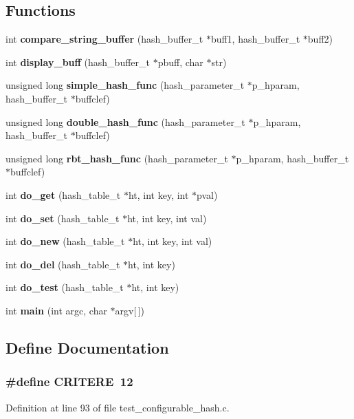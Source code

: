 \subsection*{Functions}
\begin{DoxyCompactItemize}
\item 
int {\bf compare\_\-string\_\-buffer} (hash\_\-buffer\_\-t $\ast$buff1, hash\_\-buffer\_\-t $\ast$buff2)
\item 
int {\bf display\_\-buff} (hash\_\-buffer\_\-t $\ast$pbuff, char $\ast$str)
\item 
unsigned long {\bf simple\_\-hash\_\-func} (hash\_\-parameter\_\-t $\ast$p\_\-hparam, hash\_\-buffer\_\-t $\ast$buffclef)
\item 
unsigned long {\bf double\_\-hash\_\-func} (hash\_\-parameter\_\-t $\ast$p\_\-hparam, hash\_\-buffer\_\-t $\ast$buffclef)
\item 
unsigned long {\bf rbt\_\-hash\_\-func} (hash\_\-parameter\_\-t $\ast$p\_\-hparam, hash\_\-buffer\_\-t $\ast$buffclef)
\item 
int {\bf do\_\-get} (hash\_\-table\_\-t $\ast$ht, int key, int $\ast$pval)
\item 
int {\bf do\_\-set} (hash\_\-table\_\-t $\ast$ht, int key, int val)
\item 
int {\bf do\_\-new} (hash\_\-table\_\-t $\ast$ht, int key, int val)
\item 
int {\bf do\_\-del} (hash\_\-table\_\-t $\ast$ht, int key)
\item 
int {\bf do\_\-test} (hash\_\-table\_\-t $\ast$ht, int key)
\item 
int {\bf main} (int argc, char $\ast$argv[$\,$])
\end{DoxyCompactItemize}


\subsection{Define Documentation}
\subsubsection[{CRITERE}]{\setlength{\rightskip}{0pt plus 5cm}\#define CRITERE~12}\label{test__configurable__hash_8c_ab2da1e226a5beeff3269ec19b1f2b0b9}


Definition at line 93 of file test\_\-configurable\_\-hash.c.
